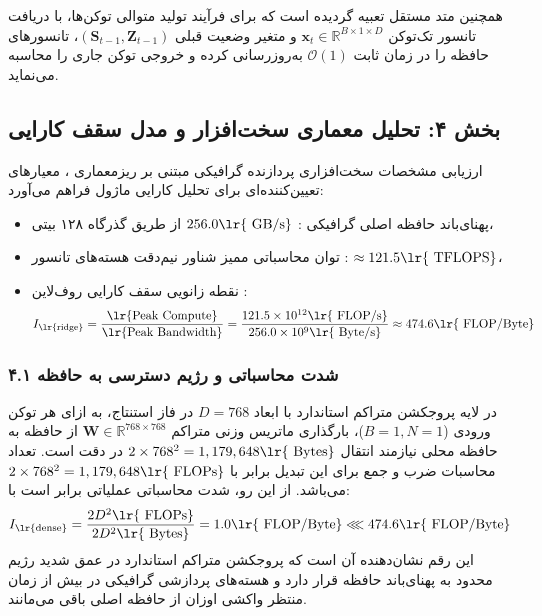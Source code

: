 همچنین متد مستقل  تعبیه گردیده است که برای فرآیند تولید متوالی توکن‌ها، با دریافت تانسور تک‌توکن $\mathbf{x}_t \in \mathbb{R}^{B \times 1 \times D}$ و متغیر وضعیت قبلی $(\mathbf{S}_{t-1}, \mathbf{Z}_{t-1})$، تانسورهای حافظه را در زمان ثابت $\mathcal{O}(1)$ به‌روزرسانی کرده و خروجی توکن جاری را محاسبه می‌نماید.

\subsection*{بخش ۴: تحلیل معماری سخت‌افزار و مدل سقف کارایی }

ارزیابی مشخصات سخت‌افزاری پردازنده گرافیکی  مبتنی بر ریزمعماری ، معیارهای تعیین‌کننده‌ای برای تحلیل کارایی ماژول فراهم می‌آورد:
\begin{itemize}
    \item پهنای‌باند حافظه اصلی گرافیکی : $256.0\text{\lr{ GB/s}}$ از طریق گذرگاه ۱۲۸ بیتی،
    \item توان محاسباتی ممیز شناور نیم‌دقت هسته‌های تانسور : $\approx 121.5\text{\lr{ TFLOPS}}$،
    \item نقطه زانویی سقف کارایی روف‌لاین :
    \begin{equation}
    I_{\text{\lr{ridge}}} = \frac{\text{\lr{Peak Compute}}}{\text{\lr{Peak Bandwidth}}} = \frac{121.5 \times 10^{12}\text{\lr{ FLOP/s}}}{256.0 \times 10^9\text{\lr{ Byte/s}}} \approx 474.6\text{\lr{ FLOP/Byte}}
    \end{equation}
\end{itemize}

\subsubsection*{۴.۱ شدت محاسباتی و رژیم دسترسی به حافظه }
در لایه پروجکشن متراکم استاندارد با ابعاد $D = 768$ در فاز استنتاج، به ازای هر توکن ورودی ($B = 1, N = 1$)، بارگذاری ماتریس وزنی متراکم $\mathbf{W} \in \mathbb{R}^{768 \times 768}$ از حافظه  به حافظه محلی نیازمند انتقال $2 \times 768^2 = 1,179,648\text{\lr{ Bytes}}$ در دقت  است. تعداد محاسبات ضرب و جمع برای این تبدیل برابر با $2 \times 768^2 = 1,179,648\text{\lr{ FLOPs}}$ می‌باشد. از این رو، شدت محاسباتی عملیاتی برابر است با:
\begin{equation}
I_{\text{\lr{dense}}} = \frac{2 D^2\text{\lr{ FLOPs}}}{2 D^2\text{\lr{ Bytes}}} = 1.0\text{\lr{ FLOP/Byte}} \lll 474.6\text{\lr{ FLOP/Byte}}
\end{equation}
این رقم نشان‌دهنده آن است که پروجکشن متراکم استاندارد در عمق شدید رژیم محدود به پهنای‌باند حافظه  قرار دارد و هسته‌های پردازشی گرافیکی در بیش از  زمان منتظر واکشی اوزان از حافظه اصلی باقی می‌مانند.

